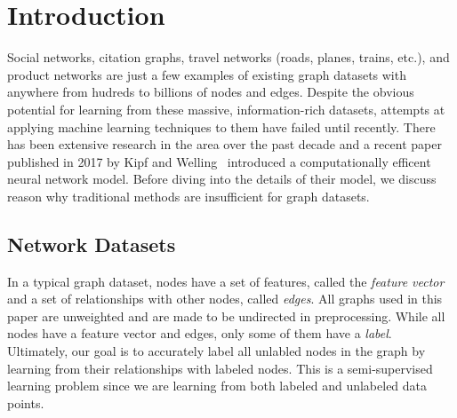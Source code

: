 \section{Introduction} \label{sec:introduction}

Social networks, citation graphs, travel networks (roads, planes, trains, etc.), and product networks are just a few examples of existing graph datasets with anywhere from hudreds to billions of nodes and edges. Despite the obvious potential for learning from these massive, information-rich datasets, attempts at applying machine learning techniques to them have failed until recently. There has been extensive research in the area over the past decade and a recent paper published in 2017 by Kipf and Welling~\cite{Kipf2016} introduced a computationally efficent neural network model. Before diving into the details of their model, we discuss reason why traditional methods are insufficient for graph datasets. 

\subsection{Network Datasets} \label{sec:network-datasets}
In a typical graph dataset, nodes have a set of features, called the \textit{feature vector} and a set of relationships with other nodes, called \textit{edges}. All graphs used in this paper are unweighted and are made to be undirected in preprocessing. While all nodes have a feature vector and edges, only some of them have a \textit{label}. Ultimately, our goal is to accurately label all unlabled nodes in the graph by learning from their relationships with labeled nodes. This is a semi-supervised learning problem since we are learning from both labeled and unlabeled data points. 



